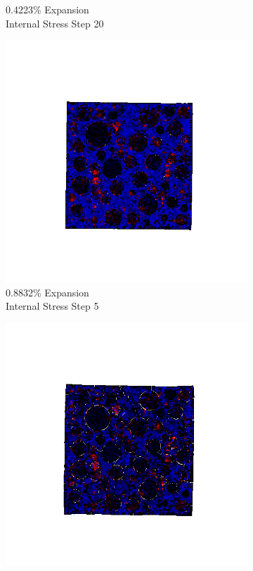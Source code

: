 \begin{figure}[ht!]
\begin{subfigure}{.25\textwidth}
      \caption{0.4223\% Expansion\\Internal Stress Step 20}
    \end{subfigure}
    
    \begin{subfigure}{.25\textwidth}
      \centering
      \includegraphics[width=1.0\linewidth]{Files/exp_3D/ASR/A30P75_4_s5.png}
      \caption{0.8832\% Expansion\\Internal Stress Step 5}
    \end{subfigure}%
    \begin{subfigure}{.25\textwidth}
      \centering
      \includegraphics[width=1.0\linewidth]{Files/exp_3D/ASR/A30P75_4_s10.png}

\end{subfigure}
\end{figure}
